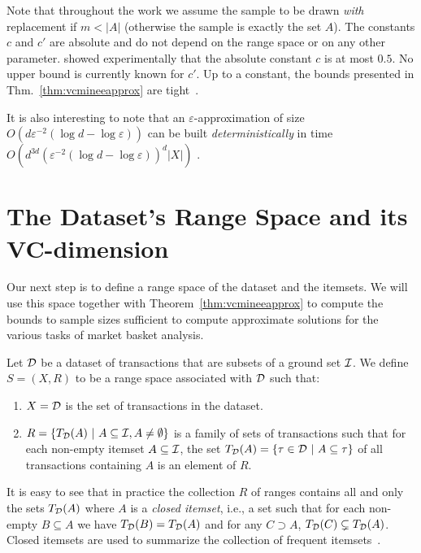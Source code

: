 Note that throughout the work we assume the sample to be drawn \emph{with}
replacement if $m<|A|$ (otherwise the sample is exactly the set $A$).  The
constants $c$ and $c'$ are absolute and do not depend on the range space or on
any other parameter. \citet{LofflerP09} showed experimentally that the absolute
constant $c$ is at most $0.5$. No upper bound is currently known for $c'$.
Up to a constant, the bounds presented in Thm.~\ref{thm:vcmineeapprox} are
tight~\cite[Thm.~5]{LiLS01}. 

It is also interesting to note that an
$\varepsilon$-approximation of size
$O(d\varepsilon^{-2}(\log d-\log\varepsilon))$ can be built
\emph{deterministically} in time
$O(d^{3d}(\varepsilon^{-2}(\log d-\log\varepsilon))^d|X|)$
\citep{Chazelle00}.

\section{The Dataset's Range Space and its VC-dimension}\label{sec:vcdimar}
Our next step is to define a range space of the dataset and the itemsets. We
will use this space together with Theorem~\ref{thm:vcmineeapprox} to compute the bounds to
sample sizes sufficient to compute approximate solutions for the various tasks
of market basket analysis. 

\begin{definition}
  Let ${\cal D}$ be a dataset of transactions that are subsets of a ground set
  ${\cal I}$.  We define $S=(X,R)$ to be a range space associated with ${\cal D}$ such
  that:
  \begin{enumerate}
    \item $X={\cal D}$ is the set of transactions in the dataset.
    \item $R=\{T_{\cal D}(A) ~|~ A\subseteq {\cal I}, A\neq\emptyset\}$ is a family of
      sets of transactions such that for each non-empty itemset
      $A\subseteq{\cal I}$, the set $T_{\cal D}(A)=\{\tau\in{\cal D} ~|~ A\subseteq\tau\}$ of
      all transactions containing $A$ is an element of $R$.
  \end{enumerate}
\end{definition}

It is easy to see that in practice the collection $R$ of ranges contains all and only
the sets $T_{\cal D}(A)$ where $A$ is a \emph{closed itemset}, i.e., a set such that
for each non-empty $B\subseteq A$ we have $T_{\cal D}(B)=T_{\cal D}(A)$ and for any
$C\supset A$, $T_{\cal D}(C)\subsetneq T_{\cal D}(A)$. Closed itemsets are used to
summarize the collection of frequent itemsets~\citep{CaldersRB06}.

